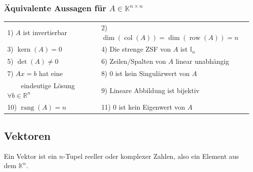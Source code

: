 \documentclass[6pt,a4paper]{scrartcl}
\DeclareMathOperator{\rang}{rang}
\DeclareMathOperator{\col}{col}
\DeclareMathOperator{\row}{row}
\DeclareMathOperator{\Kern}{kern}
\begin{document}
\begin{multicols*}{4}
\subsubsection{Äquivalente Aussagen für $A\in \mathbb K^{n\times n}$}
\begin{tabular}{ll}
	1)  $A$ ist invertierbar & 2) $\dim(\col(A))=\dim(\row(A))=n$\\
	3)  $\Kern(A)={0}$ & 4) Die strenge ZSF von $A$ ist $\mathbb{I}_n$\\
	5) $\det(A)\ne0$ & 6) Zeilen/Spalten von $A$ linear unabhängig\\
	7) $Ax=b$ hat eine & 8) 0 ist kein Singulärwert von $A$\\\ \ \ \ eindeutige Lösung $\forall b\in\mathbb{R}^n$ & 9) Lineare Abbildung ist bijektiv\\
	10)  $\rang(A)=n$ & 11) 0 ist kein Eigenwert von $A$\\

\end{tabular}

\subsection{Vektoren}
Ein Vektor ist ein $n$-Tupel reeller oder komplexer Zahlen, also ein Element aus dem $\mathbb K^n$.

\end{multicols*}
\end{document}
